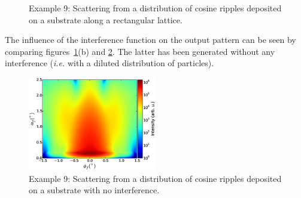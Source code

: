 \begin{figure}[H]
\hfill
{}
\hfill
{}
\hfill
\caption{Example 9: Scattering from a distribution of cosine ripples deposited on a substrate along a rectangular lattice.}
\label{fig:PythonEx9CosRipple}
\end{figure}

The influence of the interference function on the output pattern can be seen by comparing figures~\ref{fig:PythonEx9CosRipple}(b) and \ref{fig:PythonEx9CosRipplenointerf}. The latter has been generated without any interference (\textit{i.e.} with a diluted distribution of particles).

\begin{figure}[H]
\begin{center}
\includegraphics[width=0.5\textwidth]{Figures/figure_ex009CosRippleNoInterf.eps}
\end{center}
\caption{Example 9: Scattering from a distribution of cosine ripples deposited on a substrate with no interference.}
\label{fig:PythonEx9CosRipplenointerf}
\end{figure}

